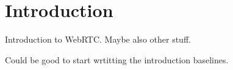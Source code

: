 \section{Introduction}

\thispagestyle{empty}

Introduction to WebRTC.
Maybe also other stuff.

Could be good to start wrtitting the introduction baselines.